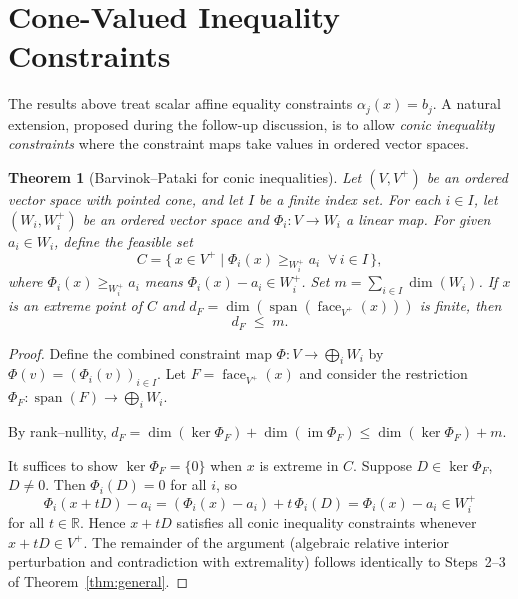 \documentclass[11pt,a4paper]{article}
\newtheorem{theorem}{Theorem}
\theoremstyle{definition}
\newcommand{\R}{\mathbb{R}}
\newcommand{\spn}{\operatorname{span}}
\newcommand{\face}{\operatorname{face}}
\newcommand{\im}{\operatorname{im}}
\begin{document}
\section{Cone-Valued Inequality Constraints}
\label{sec:conic-ineq}

The results above treat scalar affine equality constraints
$\alpha_j(x) = b_j$.  A natural extension, proposed during the
follow-up discussion, is to allow \emph{conic inequality constraints}
where the constraint maps take values in ordered vector spaces.

\begin{theorem}[Barvinok--Pataki for conic inequalities]
\label{thm:conic-ineq}
Let $(V, V^+)$ be an ordered vector space with pointed cone, and let
$I$ be a finite index set.  For each $i \in I$, let $(W_i, W_i^+)$
be an ordered vector space and $\Phi_i \colon V \to W_i$ a linear map.
For given $a_i \in W_i$, define the feasible set
\[
  C = \bigl\{\, x \in V^+ \;\big|\;
    \Phi_i(x) \geq_{W_i^+} a_i \;\;\forall\, i \in I \,\bigr\},
\]
where $\Phi_i(x) \geq_{W_i^+} a_i$ means
$\Phi_i(x) - a_i \in W_i^+$.  Set $m = \sum_{i \in I} \dim(W_i)$.
If $x$ is an extreme point of $C$ and
$d_F = \dim(\spn(\face_{V^+}(x)))$ is finite, then
\[
  \boxed{\; d_F \;\leq\; m. \;}
\]
\end{theorem}

\begin{proof}
Define the combined constraint map
$\Phi \colon V \to \bigoplus_{i} W_i$ by
$\Phi(v) = (\Phi_i(v))_{i \in I}$.  Let
$F = \face_{V^+}(x)$ and consider the restriction
$\Phi_F \colon \spn(F) \to \bigoplus_i W_i$.

By rank--nullity,
$d_F = \dim(\ker\Phi_F) + \dim(\im\Phi_F)
     \leq \dim(\ker\Phi_F) + m$.

It suffices to show $\ker\Phi_F = \{0\}$ when $x$ is extreme in $C$.
Suppose $D \in \ker\Phi_F$, $D \neq 0$.  Then $\Phi_i(D) = 0$ for
all $i$, so
\[
  \Phi_i(x + tD) - a_i
  = (\Phi_i(x) - a_i) + t\,\Phi_i(D)
  = \Phi_i(x) - a_i \in W_i^+
\]
for all $t \in \R$.  Hence $x + tD$ satisfies all conic inequality
constraints whenever $x + tD \in V^+$.  The remainder of the argument
(algebraic relative interior perturbation and contradiction
with extremality) follows identically to
Steps~2--3 of Theorem~\ref{thm:general}.
\end{proof}
\end{document}
